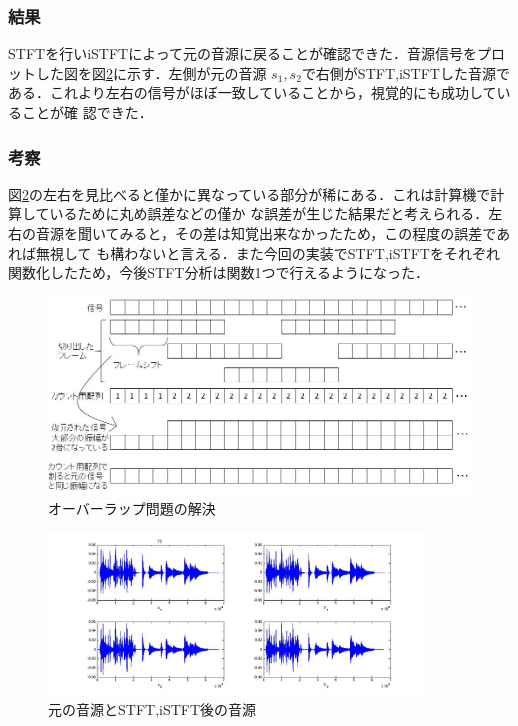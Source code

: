 \documentclass[a4j]{jarticle}
\begin{document}
\subsubsection*{結果}
STFTを行いiSTFTによって元の音源に戻ることが確認できた．音源信号をプロットした図を図\ref{stftistft}に示す．左側が元の音源
$s_1,s_2$で右側がSTFT,iSTFTした音源である．これより左右の信号がほぼ一致していることから，視覚的にも成功していることが確
認できた．
\subsubsection*{考察}
図\ref{stftistft}の左右を見比べると僅かに異なっている部分が稀にある．これは計算機で計算しているために丸め誤差などの僅か
な誤差が生じた結果だと考えられる．左右の音源を聞いてみると，その差は知覚出来なかったため，この程度の誤差であれば無視して
も構わないと言える．また今回の実装でSTFT,iSTFTをそれぞれ関数化したため，今後STFT分析は関数1つで行えるようになった．

\begin{figure}[htb]
 \begin{center}
  \includegraphics[width=20cm, clip, bb=-250 0 974 455]{pic/countX.jpg}
  \caption{オーバーラップ問題の解決}
  \label{countX}
 \end{center}
\end{figure}

\begin{figure}[htb]
 \begin{center}
  \includegraphics[width=10cm, clip, bb=0 0 1089 467]{pic/stft.jpg}
  \caption{元の音源とSTFT,iSTFT後の音源}
  \label{stftistft}
 \end{center}
\end{figure}
\end{document}
